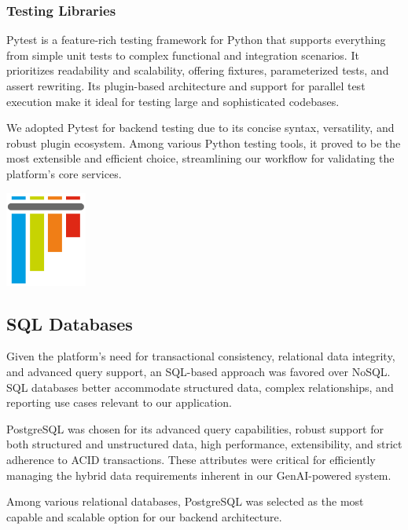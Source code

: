 \subsubsection{Testing Libraries}
Pytest is a feature-rich testing framework for Python that supports everything from simple unit tests to complex functional and integration scenarios. It prioritizes readability and scalability, offering fixtures, parameterized tests, and assert rewriting. Its plugin-based architecture and support for parallel test execution make it ideal for testing large and sophisticated codebases.\mynewline

We adopted Pytest for backend testing due to its concise syntax, versatility, and robust plugin ecosystem. Among various Python testing tools, it proved to be the most extensible and efficient choice, streamlining our workflow for validating the platform’s core services.

\begin{center}
    \centering
    \includegraphics[width=0.2\textwidth]{Images/Pytest Logo.png}
     \cite{pytest_logo}
    \label{fig:pytest_logo}
\end{center}

\subsection{SQL Databases}
Given the platform's need for transactional consistency, relational data integrity, and advanced query support, an SQL-based approach was favored over NoSQL. SQL databases better accommodate structured data, complex relationships, and reporting use cases relevant to our application.\mynewline

PostgreSQL was chosen for its advanced query capabilities, robust support for both structured and unstructured data, high performance, extensibility, and strict adherence to ACID transactions. These attributes were critical for efficiently managing the hybrid data requirements inherent in our GenAI-powered system.\mynewline

Among various relational databases, PostgreSQL was selected as the most capable and scalable option for our backend architecture.

